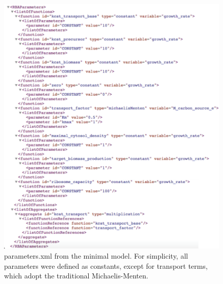 \begin{figure}
  \centering
  \includegraphics[scale=0.6]{figures/parameters_ex_2}
  \caption{parameters.xml from the minimal model.
  For simplicity, all parameters were defined as constants,
  except for transport terms, which adopt the traditional Michaelis-Menten.}
  \label{fig:parameters_ex_2}
\end{figure}
